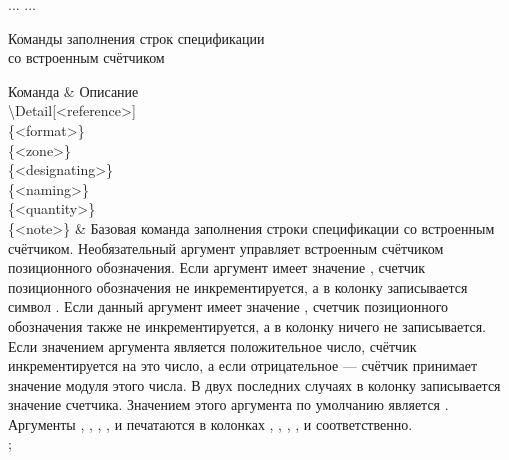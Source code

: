 \begin{pcbdoccode}
...
\El
\Ai
\ICd
\Dd
\DigDoc
...
\end{pcbdoccode}


\begin{tikztablex}
{
\caption{Команды заполнения строк спецификации\\со встроенным счётчиком}
\label{tabular:speclines2}
}
{
Команда & Описание\\
{\textbackslash{}Detail[<reference>]\\
\{<format>\}\\
\{<zone>\}\\
\{<designating>\}\\
\{<naming>\}\\
\{<quantity>\}\\
\{<note>\}}
& Базовая команда заполнения строки спецификации со встроенным
счётчиком. Необязательный аргумент  управляет встроенным счётчиком
позиционного обозначения. Если аргумент  имеет значение \sfemph{-},
счетчик позиционного обозначения не инкрементируется, а в колонку
\colorbox{resultcolor}{} записывается символ \sfemph{-}. Если данный
аргумент имеет значение , счетчик позиционного обозначения также не
инкрементируется, а в колонку \colorbox{resultcolor}{} ничего не
записывается. Если значением аргумента является положительное число, счётчик
инкрементируется на это число, а если отрицательное --- счётчик принимает значение
модуля этого числа. В двух последних случаях в колонку {} записывается
значение счетчика. Значением этого аргумента по умолчанию является
. Аргументы , , ,
,  и  печатаются в колонках
\colorbox{resultcolor}{},
\colorbox{resultcolor}{},
\colorbox{resultcolor}{},
\colorbox{resultcolor}{}, \colorbox{resultcolor}{} и
\colorbox{resultcolor}{} соответственно.\\
};
\end{tikztablex}

\clearpage
